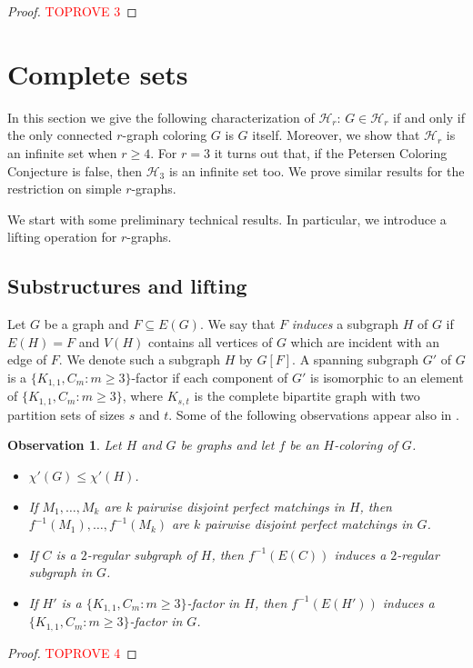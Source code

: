 \documentclass[a4paper,11pt]{article}
\newcommand{\ca}{\mathcal}
\newtheorem{obs}[defi]{Observation}
\theoremstyle{remark}
\begin{document}
\begin{proof}\textcolor{red}{TOPROVE 3}\end{proof}


\section{Complete sets} \label{Sec: H-coloring}

In this section we give the following characterization of $\ca H_r$: $G\in \ca H_r$ if and only if the only connected $r$-graph coloring $G$ is $G$ itself. Moreover, we show that $\ca H_r$ is an infinite set when $r\ge 4$. For $r=3$ it turns out that, if the Petersen Coloring Conjecture is false, then $\ca H_3$ is an infinite set too.
We prove similar results for the restriction on simple $r$-graphs.

We start with some preliminary technical results. In particular, we introduce a lifting operation for $r$-graphs.


\subsection{Substructures and lifting}

Let $G$ be a graph and $F \subseteq E(G)$. We say that $F$ \emph{induces} a subgraph $H$
of $G$ if $E(H) = F$ and $V(H)$ contains all vertices of $G$ which are incident with
an edge of $F$. We denote such a subgraph $H$ by $G[F]$. 
A spanning subgraph $ G' $ of $ G $ is a 
$ \{K_{1,1}, C_m\colon m\geq3\} $-factor if each component of $ G' $ is isomorphic to an element of $ \{K_{1,1}, C_m\colon m\geq3\} $, where $ K_{s,t} $ is the complete bipartite graph with two partition sets of sizes $ s $ and $ t $.
Some of the following observations appear also in  \cite{MTZ_r_graphs}.

\begin{obs}
	\label{obs:coloring_basics}
	Let $H$ and $G$ be graphs and let $f$ be an $H$-coloring of $G$.
	\begin{itemize}
		\item[(i)] $\chi'(G) \leq \chi'(H)$.
		\item[(ii)] If $M_1,\dots, M_k$ are $k$ pairwise disjoint perfect matchings in $H$, then $f^{-1}(M_1),\dots, f^{-1}(M_k)$ are $k$ pairwise disjoint perfect matchings in $G$.
		\item[(iii)] If $C$ is a $2$-regular subgraph of $H$, then $f^{-1}(E(C))$ induces a $2$-regular subgraph in $G$.
		\item[(iv)] If $ H' $ is a $ \{K_{1,1}, C_m\colon m\geq3\} $-factor in $H$, then $ f^{-1} (E(H'))$ induces a $ \{K_{1,1}, C_m\colon m\geq3\} $-factor in $ G $.
	\end{itemize}
\end{obs}
\begin{proof}\textcolor{red}{TOPROVE 4}\end{proof}
\end{document}
